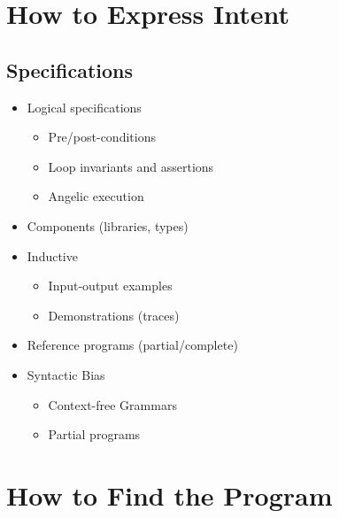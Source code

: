 \documentclass[notes=hide]{beamer}
\begin{document}

\section{How to Express Intent}

\subsection{Specifications}

\begin{frame}{\secname}{\subsecname}
  \begin{itemize}
  \item<+-> Logical specifications
    \begin{itemize}
    \item Pre/post-conditions
    \item Loop invariants and assertions
    \item Angelic execution
    \end{itemize}
  \item<+-> Components (libraries, types)
  \item<+-> Inductive
    \begin{itemize}
    \item Input-output examples   %
    \item Demonstrations (traces) %
    \end{itemize}
  \item<+-> Reference programs (partial/complete)
  \item<+-> Syntactic Bias
    \begin{itemize}
    \item Context-free Grammars
    \item Partial programs %
    \end{itemize}
  \end{itemize}
\end{frame}

\section{How to Find the Program}
\end{document}
